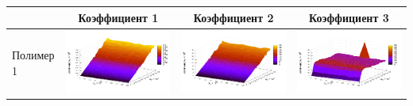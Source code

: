 \documentclass[11pt,a4paper]{article}
\theoremstyle{definition}
\begin{document}
\begin{table}[h]
  \centering
  \footnotesize
  \begin{tabular}{l | c c c}
	  & Коэффициент 1 & Коэффициент 2 & Коэффициент 3 \\ \hline
	\begin{rotate}{90}Полимер 1\end{rotate} &	\includegraphics[scale=0.4]{figs/all/p1.txt_coeff0.dat.pdf} & \includegraphics[scale=0.4]{figs/all/p1.txt_coeff1.dat.pdf} & \includegraphics[scale=0.4]{figs/all/p1.txt_coeff2.dat.pdf} \\

\end{tabular}
\end{table}
\end{document}
